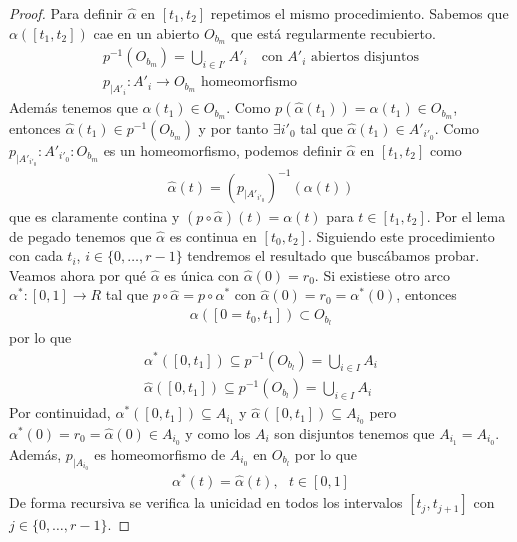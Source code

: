 \begin{lema}
\begin{proof}
       Para definir $\hat{\alpha}$ en $[t_1,t_2]$ repetimos el mismo procedimiento. Sabemos que $\alpha([t_1,t_2])$ cae en un abierto $O_{b_m}$ que está regularmente recubierto.
       \begin{gather*}
            p^{-1}(O_{b_m}) = \bigcup\limits_{i\in I'} A'_i\ \ \ \text{ con $A'_i$ abiertos disjuntos}\\
            p_{|A'_i} : A'_i \to O_{b_m} \text{ homeomorfismo}
       \end{gather*}
       Además tenemos que $\alpha(t_1)\in O_{b_m}$. Como $p(\hat{\alpha}(t_1)) = \alpha(t_1)\in O_{b_m}$, entonces $\hat{\alpha}(t_1)\in p^{-1}(O_{b_m})$ y por tanto $\exists i'_0$ tal que $\hat{\alpha}(t_1)\in A'_{i'_0}$. Como $p_{|A'_{i'_0}}:A'_{i'_0}:O_{b_m}$ es un homeomorfismo, podemos definir $\hat{\alpha}$ en $[t_1,t_2]$ como 
       \begin{gather*}
            \hat{\alpha}(t) = (p_{|A'_{i'_0}})^{-1}(\alpha(t))    
       \end{gather*}
       que es claramente contina y $(p\circ \hat{\alpha})(t)=\alpha(t)$ para $t\in [t_1,t_2]$. Por el lema de pegado tenemos que $\hat{\alpha}$ es continua en $[t_0,t_2]$. Siguiendo este procedimiento con cada $t_i$, $i\in\{0,\dots,r-1\}$ tendremos el resultado que buscábamos probar.\\

       Veamos ahora por qué $\hat{\alpha}$ es única con $\hat{\alpha}(0)=r_0$. Si existiese otro arco $\alpha^*:[0,1]\to R$ tal que $p\circ \hat{\alpha} = p\circ \alpha^*$ con $\hat{\alpha}(0) = r_0 = \alpha^*(0)$, entonces 
       \begin{gather*}
            \alpha([0=t_0,t_1]) \subset O_{b_l}
       \end{gather*}
       por lo que 
       \begin{gather*}
            \alpha^*([0,t_1]) \subseteq p^{-1}(O_{b_l}) = \bigcup\limits_{i\in I} A_i\\
            \hat{\alpha}([0,t_1]) \subseteq p^{-1}(O_{b_l}) = \bigcup\limits_{i\in I} A_i
       \end{gather*}
       Por continuidad, $\alpha^*([0,t_1])\subseteq A_{i_1}$ y $\hat{\alpha}([0,t_1])\subseteq A_{i_0}$ pero $\alpha^*(0)=r_0=\hat{\alpha}(0)\in A_{i_0}$ y como los $A_i$ son disjuntos tenemos que $A_{i_1} = A_{i_0}$. Además, $p_{|A_{i_0}}$ es homeomorfismo de $A_{i_0}$ en $O_{b_l}$ por lo que 
       \begin{gather*}
            \alpha^*(t) = \hat{\alpha}(t),\ \ \ t\in [0,1]
       \end{gather*}
       De forma recursiva se verifica la unicidad en todos los intervalos $[t_j, t_{j+1}]$ con $j\in \{0,\dots,r-1\}$.
    \end{proof}
\end{lema}

